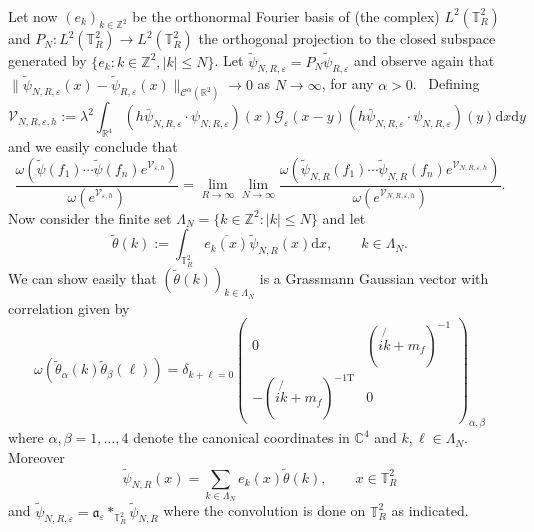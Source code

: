 \documentclass{article}
\newcommand{\assign}{:=}
\newcommand{\mathd}{\mathrm{d}}
\begin{document}
\

Let now $(e_k)_{k \in \mathbb{Z}^2}$ be the orthonormal Fourier basis of (the
complex) $L^2 (\mathbb{T}_R^2)$ and $P_N : L^2 (\mathbb{T}_R^2) \rightarrow
L^2 (\mathbb{T}_R^2)$ the orthogonal projection to the closed subspace
generated by $\{ e_k : k \in \mathbb{Z}^2, | k | \leqslant N \}$. Let
$\tilde{\psi}_{N, R, \varepsilon} = P_N \tilde{\psi}_{R, \varepsilon}$ and
observe again that $\| \tilde{\psi}_{N, R, \varepsilon} (x) - \tilde{\psi}_{R,
\varepsilon} (x) \|_{\mathcal{C}^{\alpha} (\mathbb{R}^2)} \rightarrow 0$ as $N
\rightarrow \infty$, for any $\alpha > 0$. \ Defining
\[ \mathcal{V}_{N, R, \varepsilon, h} \assign \lambda^2 \int_{\mathbb{R}^4} (h
   \bar{\psi}_{N, R, \varepsilon} \cdot \psi_{N, R, \varepsilon}) (x)
   \mathcal{G}_{\varepsilon} (x - y) (h \bar{\psi}_{N, R, \varepsilon} \cdot
   \psi_{N, R, \varepsilon}) (y) \mathd x \mathd y \]
and we easily conclude that
\begin{equation}
  \frac{\omega (\tilde{\psi} (f_1) \cdots \tilde{\psi} (f_n)
  e^{\mathcal{V}_{\varepsilon, h}})}{\omega (e^{\mathcal{V}_{\varepsilon,
  h}})} = \lim_{R \rightarrow \infty} \lim_{N \rightarrow \infty} \frac{\omega
  (\tilde{\psi}_{N, R} (f_1) \cdots \tilde{\psi}_{N, R} (f_n)
  e^{\mathcal{V}_{N, R, \varepsilon, h}})}{\omega (e^{\mathcal{V}_{N, R,
  \varepsilon, h}})} \label{eq:euclidean-yukawa-fermion-periodic-galerkin} .
\end{equation}
Now consider the finite set $\Lambda_N = \{ k \in \mathbb{Z}^2 : | k |
\leqslant N \}$ and let
\[ \tilde{\theta} (k) \assign \int_{\mathbb{T}_R^2} \overline{e_k (x)}
   \tilde{\psi}_{N, R} (x) \mathd x, \qquad k \in \Lambda_N . \]
We can show easily that $(\tilde{\theta} (k))_{k \in \Lambda_N}$ is a
Grassmann Gaussian vector with correlation given by
\begin{equation}
  \omega (\tilde{\theta}_{\alpha} (k) \tilde{\theta}_{\beta} (\ell)) =
  \delta_{k + \ell = 0} \left(\begin{array}{cc}
    0 & \left( i \not{k} + m_f \right)^{- 1}\\
    - \left( i \not{k} + m_f \right)^{- 1\mathrm{T}} & 0
  \end{array}\right)_{\alpha, \beta}
  \label{eq:free-corrrelation-fourier-galerkin}
\end{equation}
where $\alpha, \beta = 1, \ldots, 4$ denote the canonical coordinates in
$\mathbb{C}^4$ and $k, \ell \in \Lambda_N$. Moreover
\[ \tilde{\psi}_{N, R} (x) = \sum_{k \in \Lambda_N} e_k (x) \tilde{\theta}
   (k), \qquad x \in \mathbb{T}^2_R \]
and $\tilde{\psi}_{N, R, \varepsilon} = \mathfrak{a}_{\varepsilon}
\ast_{\mathbb{T}_R^2} \tilde{\psi}_{N, R}$ where the convolution is done on
$\mathbb{T}^2_R$ as indicated.
\end{document}
